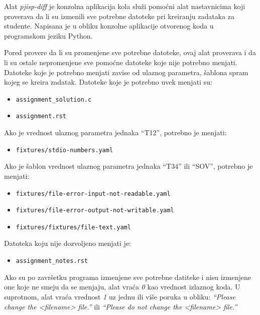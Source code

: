 \documentclass[12pt]{report}
\begin{document}
Alat \textit{pjisp-diff} \cite{pjisp-diff} je konzolna aplikacija kola služi pomoćni alat nastavnicima koji proverava da li su izmenili sve potrebne datoteke pri kreiranju zadataka za studente. Napisana je u obliku konzolne aplikacije otvorenog koda u programskom jeziku Python.

Pored provere da li su promenjene sve potrebne datoteke, ovaj alat proverava i da li su ostale nepromenjene sve pomoćne datoteke koje nije potrebno menjati. Datoteke koje je potrebno menjati zavise od ulaznog parametra, šablona spram kojeg se kreira zadatak. Datoteke koje je potrebno uvek menjati su:

\begin{itemize}
    \item \texttt{assignment\_solution.c}
    \item \texttt{assignment.rst}
\end{itemize}

Ako je vrednost ulaznog parametra jednaka ``T12'', potrebno je menjati:

\begin{itemize}
    \item \texttt{fixtures/stdio-numbers.yaml}
\end{itemize}

Ako je šablon vrednost ulaznog parametra jednaka ``T34'' ili ``SOV'', potrebno je menjati:

\begin{itemize}
    \item \texttt{fixtures/file-error-input-not-readable.yaml}
    \item \texttt{fixtures/file-error-output-not-writable.yaml}
    \item \texttt{fixtures/fixtures/file-text.yaml}
\end{itemize}

Datoteka koju nije dozvoljeno menjati je:

\begin{itemize}
    \item \texttt{assignment\_notes.rst}
\end{itemize}

Ako su po završetku programa izmenjene sve potrebne datiteke i nisu izmenjene one koje ne smeju da se menjaju, alat vraća \textit{0} kao vrednost izlaznog koda. U suprotnom, alat vraća vrednost \textit{1} uz jednu ili više poruka u obliku: \textit{``Please change the <filename> file.''} ili \textit{``Please do not change the <filename> file.''}
\end{document}
